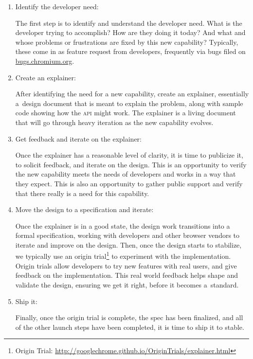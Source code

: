 \documentclass[sigconf, anonymous]{acmart}
\begin{document}
\begin{enumerate}  
  \item Identify the developer need:
  
  The first step is to identify and understand the developer need.
  What is the developer trying to accomplish?
  How are they doing it today? And what and whose problems or frustrations
  are fixed by this new capability? Typically, these come in as feature request
  from developers, frequently via bugs filed on \url{bugs.chromium.org}.

  \item Create an explainer:

  After identifying the need for a new capability, create an explainer,
  essentially a~design document that is meant to explain the problem,
  along with sample code showing how the \textsc{api} might work.
  The explainer is a living document that will go through heavy iteration
  as the new capability evolves.

  \item Get feedback and iterate on the explainer:

  Once the explainer has a reasonable level of clarity,
  it is time to publicize it, to solicit feedback, and iterate on the design.
  This is an opportunity to verify the new capability meets the needs of developers
  and works in a way that they expect. This is also an opportunity to gather
  public support and verify that there really is a need for this capability.

  \item Move the design to a specification and iterate:
  
  Once the explainer is in a good state,
  the design work transitions into a formal specification,
  working with developers and other browser vendors to iterate and improve on the design.
  Then, once the design starts to stabilize, we typically use an
  origin trial\footnote{Origin Trial: \url{http://googlechrome.github.io/OriginTrials/explainer.html}}
  to experiment with the implementation.
  Origin trials allow developers to try new features with real users,
  and give feedback on the implementation.
  This real world feedback helps shape and validate the design,
  ensuring we get it right, before it becomes a~standard.

  \item Ship it:

  Finally, once the origin trial is complete, the spec has been finalized,
  and all of the other launch steps have been completed, it is time to ship it to stable.  
\end{enumerate}
\end{document}

